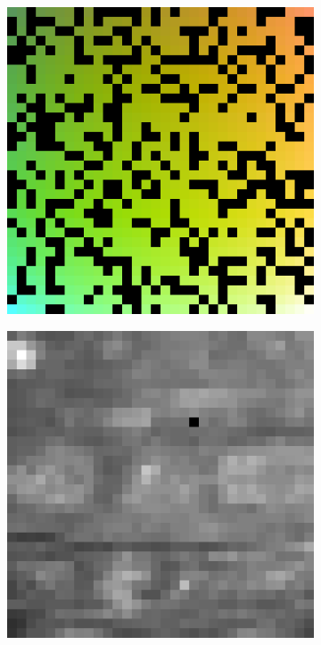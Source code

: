 \begin{figure}
	
	
	\begin{subfigure}[b]{0.19\linewidth}
		\includegraphics[width=\linewidth]{./Figures/gcnn_synthetic/eval_2_input.png}
	\end{subfigure}
	\begin{subfigure}[b]{0.19\linewidth}
	\includegraphics[width=\linewidth]{./Figures/gcnn_synthetic/eval_2_img.png}

\end{subfigure}
\end{figure}
